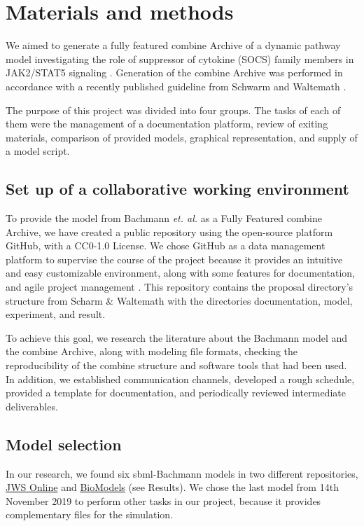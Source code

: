 \section*{Materials and methods} \label{matmet}

We aimed to generate a fully featured \ac{combine} Archive of a dynamic pathway model investigating the role of suppressor of cytokine (SOCS) family members in JAK2/STAT5 signaling \cite{bachmannmodel}. Generation of the \ac{combine} Archive was performed in accordance with a recently published guideline from Schwarm and Waltemath \cite{combine}.

The purpose of this project was divided into four groups. The tasks of each of them were the management of a documentation platform, review of exiting materials, comparison of provided models, graphical representation, and supply of a model script.

\subsection*{Set up of a collaborative working environment}
To provide the model from Bachmann \textit{et. al.}\cite{bachmannmodel} as a Fully Featured \ac{combine} Archive, we have created a public repository using the open-source platform GitHub, with a CC0-1.0 License. We chose GitHub as a data management platform to supervise the course of the project because it provides an intuitive and easy customizable environment, along with some features for documentation, and agile project management \cite{github}. This repository contains the proposal directory's structure from Scharm \& Waltemath \cite{combine} with the directories documentation, model, experiment, and result.

To achieve this goal, we research the literature about the Bachmann model and the \ac{combine} Archive, along with modeling file formats, checking the reproducibility of the \ac{combine} structure and software tools that had been used. In addition, we established communication channels, developed a rough schedule, provided a template for documentation, and periodically reviewed intermediate deliverables.

\subsection*{Model selection}
In our research, we found six \ac{sbml}-Bachmann models in two different repositories, \hyperlink{https://www.systemsmedicine.net/posts/jws-online-biological-systems-modelling}{JWS Online} and \hyperlink{https://www.ebi.ac.uk/biomodels/}{BioModels} (see Results). We chose the last model from 14th November 2019 to perform other tasks in our project, because it provides complementary files for the simulation.

